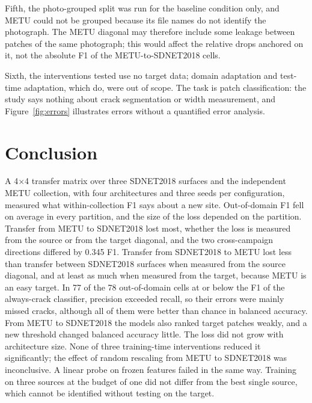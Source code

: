 \documentclass[pdflatex,sn-apa]{sn-jnl}
\begin{document}
Fifth, the photo-grouped split was run for the baseline condition only, and METU could not be grouped because its file names do not identify the photograph. The METU diagonal may therefore include some leakage between patches of the same photograph; this would affect the relative drops anchored on it, not the absolute F1 of the METU-to-SDNET2018 cells.

Sixth, the interventions tested use no target data; domain adaptation and test-time adaptation, which do, were out of scope. The task is patch classification: the study says nothing about crack segmentation or width measurement, and Figure~\ref{fig:errors} illustrates errors without a quantified error analysis.

\section{Conclusion}\label{sec:conclusion}

A 4$\times$4 transfer matrix over three SDNET2018 surfaces and the independent METU collection, with four architectures and three seeds per configuration, measured what within-collection F1 says about a new site. Out-of-domain F1 fell on average in every partition, and the size of the loss depended on the partition. Transfer from METU to SDNET2018 lost most, whether the loss is measured from the source or from the target diagonal, and the two cross-campaign directions differed by 0.345 F1. Transfer from SDNET2018 to METU lost less than transfer between SDNET2018 surfaces when measured from the source diagonal, and at least as much when measured from the target, because METU is an easy target. In 77 of the 78 out-of-domain cells at or below the F1 of the always-crack classifier, precision exceeded recall, so their errors were mainly missed cracks, although all of them were better than chance in balanced accuracy. From METU to SDNET2018 the models also ranked target patches weakly, and a new threshold changed balanced accuracy little. The loss did not grow with architecture size. None of three training-time interventions reduced it significantly; the effect of random rescaling from METU to SDNET2018 was inconclusive. A linear probe on frozen features failed in the same way. Training on three sources at the budget of one did not differ from the best single source, which cannot be identified without testing on the target.
\end{document}
